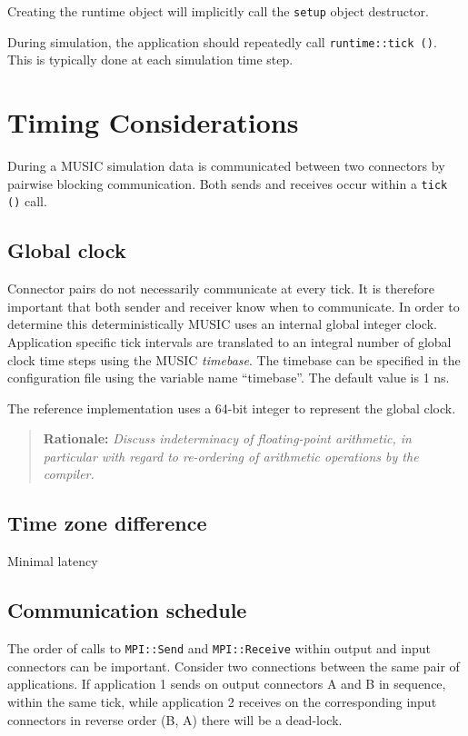 \documentclass[a4paper]{report}
\newenvironment{rationale}%
{\par\begin{quote}\textbf{Rationale:}}%
{\par\end{quote}}
\begin{document}
\begin{metatext}
Creating the runtime object will implicitly call the \lstinline|setup|
object destructor.

During simulation, the application should repeatedly call
\lstinline|runtime::tick ()|.  This is typically done at each simulation
time step.

\section{Timing Considerations}

During a MUSIC simulation data is communicated between two connectors
by pairwise blocking communication.  Both sends and receives occur
within a \lstinline|tick ()| call.

\subsection{Global clock}

Connector pairs do not necessarily communicate at every tick.  It is
therefore important that both sender and receiver know when to
communicate.  In order to determine this deterministically MUSIC uses
an internal global integer clock.  Application specific tick intervals
are translated to an integral number of global clock time steps using
the MUSIC \emph{timebase}.  The timebase can be specified in the
configuration file using the variable name ``timebase''.  The default
value is 1 ns.

The reference implementation uses a 64-bit integer to represent the
global clock.

\begin{rationale}
  \emph{Discuss indeterminacy of floating-point arithmetic, in particular
    with regard to re-ordering of arithmetic operations by the compiler.}
\end{rationale}

\subsection{Time zone difference}

Minimal latency

\subsection{Communication schedule}

The order of calls to \lstinline|MPI::Send| and \lstinline|MPI::Receive| within
output and input connectors can be important.  Consider two
connections between the same pair of applications.  If application 1
sends on output connectors A and B in sequence, within the same tick,
while application 2 receives on the corresponding input connectors in
reverse order (B, A) there will be a dead-lock.


\end{metatext}
\end{document}
